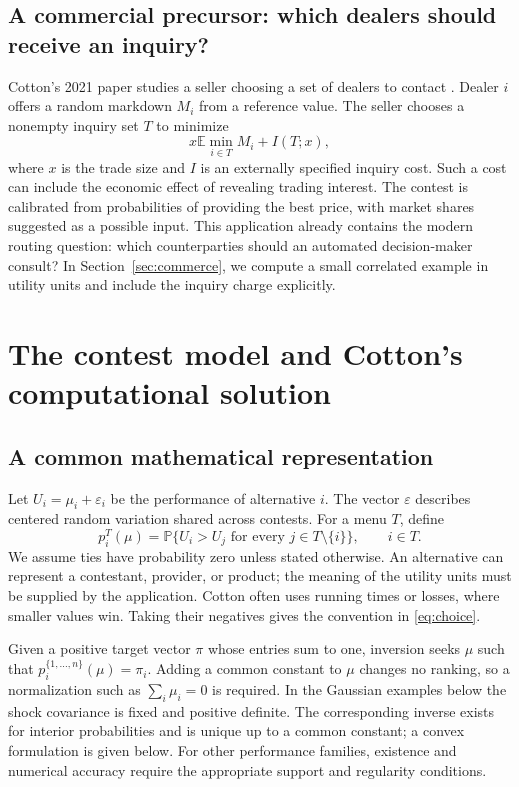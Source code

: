 \documentclass[11pt]{amsart}
\newcommand{\E}{\mathbb E}
\newcommand{\Prob}{\mathbb P}
\theoremstyle{definition}
\begin{document}
\subsection{A commercial precursor: which dealers should receive an inquiry?}
Cotton's 2021 paper studies a seller choosing a set of dealers to contact \cite[Section~4.1]{cotton2021}. Dealer $i$ offers a random markdown $M_i$ from a reference value. The seller chooses a nonempty inquiry set $T$ to minimize
\begin{equation}\label{eq:cotton_inquiry}
 x\E\min_{i\in T}M_i+I(T;x),
\end{equation}
where $x$ is the trade size and $I$ is an externally specified inquiry cost. Such a cost can include the economic effect of revealing trading interest. The contest is calibrated from probabilities of providing the best price, with market shares suggested as a possible input. This application already contains the modern routing question: which counterparties should an automated decision-maker consult? In Section~\ref{sec:commerce}, we compute a small correlated example in utility units and include the inquiry charge explicitly.

\section{The contest model and Cotton's computational solution}

\subsection{A common mathematical representation}
Let $U_i=\mu_i+\varepsilon_i$ be the performance of alternative $i$. The vector $\varepsilon$ describes centered random variation shared across contests. For a menu $T$, define
\begin{equation}\label{eq:choice}
 p_i^T(\mu)=\Prob\{U_i>U_j\text{ for every }j\in T\setminus\{i\}\},\qquad i\in T.
\end{equation}
We assume ties have probability zero unless stated otherwise. An alternative can represent a contestant, provider, or product; the meaning of the utility units must be supplied by the application. Cotton often uses running times or losses, where smaller values win. Taking their negatives gives the convention in \eqref{eq:choice}.

Given a positive target vector $\pi$ whose entries sum to one, inversion seeks $\mu$ such that $p_i^{\{1,\ldots,n\}}(\mu)=\pi_i$. Adding a common constant to $\mu$ changes no ranking, so a normalization such as $\sum_i\mu_i=0$ is required. In the Gaussian examples below the shock covariance is fixed and positive definite. The corresponding inverse exists for interior probabilities and is unique up to a common constant; a convex formulation is given below. For other performance families, existence and numerical accuracy require the appropriate support and regularity conditions.
\end{document}
